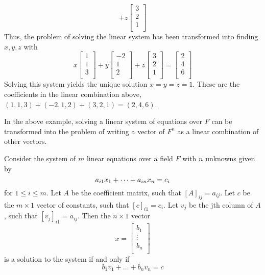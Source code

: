 \documentclass{article}
\begin{document}
\begin{examples}
\[    +z
    \begin{bmatrix}
      3\\
      2\\
      1\\
    \end{bmatrix}
  \]
  Thus, the problem of solving the linear system has been transformed into finding $x, y, z$ with
  \[
    x
    \begin{bmatrix}
      1\\
      1\\
      3\\
    \end{bmatrix}
    +y
    \begin{bmatrix}
      -2\\
      1\\
      2\\
    \end{bmatrix}
    +z
    \begin{bmatrix}
      3\\
      2\\
      1\\
    \end{bmatrix}
    =
    \begin{bmatrix}
      2\\
      4\\
      6\\
    \end{bmatrix}
  \]
  Solving this system yields the unique solution $x = y = z = 1$. These are the coefficients in the linear combination above, $(1, 1, 3) + (-2, 1, 2) + (3, 2, 1) = (2, 4, 6)$.

  In the above example, solving a linear system of equations over $F$ can be transformed into the problem of writing a vector of $F^n$ as a linear combination of other vectors.
\end{examples}
\begin{theorem}
  Consider the system of $m$ linear equations over a field $F$ with $n$ unknowns given by
  \[
    a_{i1}x_1 + \dots + a_{in}x_n = c_i\\
  \]
  for $1 \leq i \leq m$. Let $A$ be the coefficient matrix, such that $[A]_{ij} = a_{ij}$. Let $c$ be the $m \times 1$ vector of constants, such that $[c]_{i1} = c_i$. Let $v_j$ be the jth column of $A$, such that $[v_j]_{i1} = a_{ij}$. Then the $n \times 1$ vector
  \[
    x =
    \begin{bmatrix}
      b_1\\
      \vdots\\
      b_n\\
    \end{bmatrix}
  \]
  is a solution to the system if and only if
  \[b_1v_1 + \dots + b_nv_n = c\]
\end{theorem}
\end{document}

